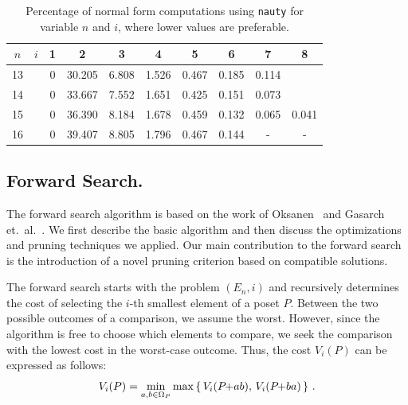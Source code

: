 \documentclass[a4paper,UKenglish,cleveref, autoref, thm-restate]{lipics-v2021}
\newcommand{\pchild}[3]{{#1}\kern-1pt{+}{#2}{#3}}
\begin{document}
\begin{table}[!t]
  \renewcommand{\arraystretch}{1.1}
  \caption{Percentage of normal form computations using \texttt{nauty} for variable $n$ and $i$, where lower values are preferable.}
  \label{table:nauty-ratio}
  \centering
  \small
  \begin{tabular}{cr|cccccccc}
    $n$ & $i$    & 1                       & 2      & 3     & 4     & 5     & 6     & 7     & 8     \\ \hline
    13 & & 0                       & 30.205 & 6.808 & 1.526 & 0.467 & 0.185 & 0.114 &       \\
    14 & & 0                       & 33.667 & 7.552 & 1.651 & 0.425 & 0.151 & 0.073 &       \\
    15 & & 0                       & 36.390 & 8.184 & 1.678 & 0.459 & 0.132 & 0.065 & 0.041 \\
    16 & & 0                       & 39.407 & 8.805 & 1.796 & 0.467 & 0.144 & -     & -     \\
  \end{tabular}%
\end{table}

\subsection{Forward Search.} \label{chapter:forward_search}
The forward search algorithm is based on the work of Oksanen~\cite{Oksanen2006} and Gasarch et.\ al\@.~\cite{Gasarch1996}.
We first describe the basic algorithm and then discuss the optimizations and pruning techniques we applied.
Our main contribution to the forward search is the introduction of a novel pruning criterion based on compatible solutions.

The forward search starts with the problem $(E_n, i)$ and recursively determines the cost of selecting the $i$-th smallest element of a poset $P$.
Between the two possible outcomes of a comparison, we assume the worst.
However, since the algorithm is free to choose which elements to compare, we seek the comparison with the lowest cost in the worst-case outcome.
Thus, the cost $V_i(P)$ can be expressed as follows:
\begin{equation}
  V_i(P) = \min_{a,b \in \Omega_P} \max \left\{ \,V_i(\pchild{P}{a}{b}),\, V_i(\pchild{P}{b}{a})\,\right\}\,\text{.}
\end{equation}
\end{document}
